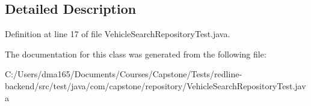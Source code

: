 \subsection{Detailed Description}


Definition at line 17 of file Vehicle\+Search\+Repository\+Test.\+java.



The documentation for this class was generated from the following file\+:\begin{DoxyCompactItemize}
\item 
C\+:/\+Users/dma165/\+Documents/\+Courses/\+Capstone/\+Tests/redline-\/backend/src/test/java/com/capstone/repository/Vehicle\+Search\+Repository\+Test.\+java\end{DoxyCompactItemize}
